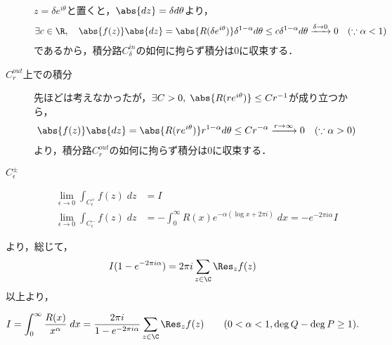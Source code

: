 \documentclass[uplatex, dvipdfmx]{jsreport}
\begin{document}
\begin{discussion}[非整数冪]
\begin{description}
        $z=\delta e^{i\theta}$と置くと，$\abs{dz}=\delta d\theta$より，
        \begin{align*}
            \exists c\in\R,\quad\abs{f(z)}\abs{dz}&=\abs{R(\delta e^{i\theta})}\delta^{1-\alpha}d\theta
            \le c\delta^{1-\alpha}d\theta\xrightarrow{\delta\to 0}0&(\because \alpha<1)
        \end{align*}
        であるから，積分路$C^{in}_\delta$の如何に拘らず積分は$0$に収束する．
        \item[$C^{out}_r$上での積分]
        先ほどは考えなかったが，$\exists C>0,\;\abs{R(re^{i\theta})}\le Cr^{-1}$が成り立つから，
        \begin{align*}
            \abs{f(z)}\abs{dz}&=\abs{R(re^{i\theta})}r^{1-\alpha}d\theta\le Cr^{-\alpha}\xrightarrow{r\to\infty}0&(\because \alpha>0)
        \end{align*}
        より，積分路$C^{out}_r$の如何に拘らず積分は$0$に収束する．
        \item[$C_\epsilon^\pm$]
        \begin{align*}
            \lim_{\epsilon\to 0}\int_{C^+_\epsilon}f(z)\;dz&=I\\
            \lim_{\epsilon\to 0}\int_{C^-_\epsilon}f(z)\;dz&=-\int^\infty_0R(x)e^{-\alpha(\log x+2\pi i)}\;dx=-e^{-2\pi i\alpha}I
        \end{align*}
    \end{description}より，総じて，
    \begin{align*}
        I(1-e^{-2\pi i\alpha})=2\pi i\sum_{z\in\C}\Res_zf(z)
    \end{align*}
    以上より，
    \begin{screen}
        \[I=\int^\infty_0\frac{R(x)}{x^\alpha}\;dx=\frac{2\pi i}{1-e^{-2\pi i\alpha}}\sum_{z\in\C}\Res_zf(z)\qquad(0<\alpha<1,\deg Q-\deg P\ge 1).\]
    \end{screen}
\end{discussion}
\end{document}
